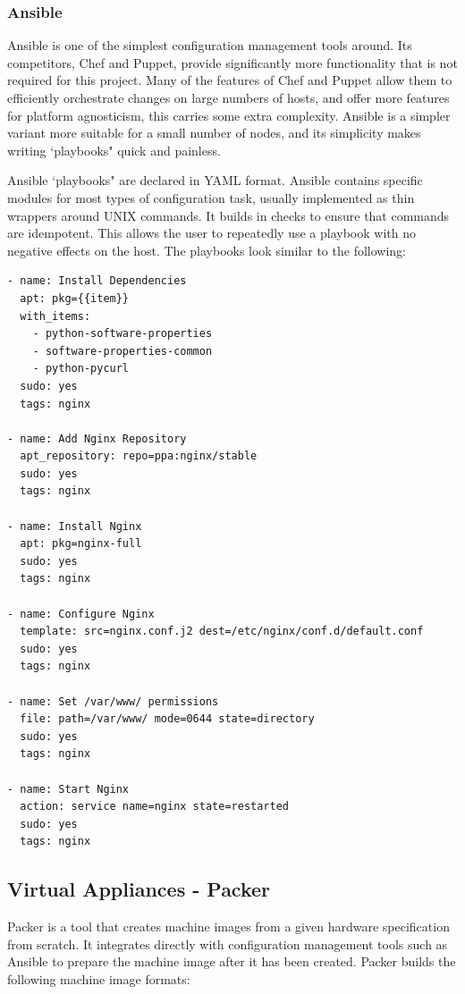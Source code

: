 \documentclass{cshonours}
\begin{document}
\subsubsection{Ansible}

Ansible is one of the simplest configuration management tools around. Its competitors, Chef and Puppet, provide significantly more functionality that is not required for this project. Many of the features of Chef and Puppet allow them to efficiently orchestrate changes on large numbers of hosts, and offer more features for platform agnosticism, this carries some extra complexity. Ansible is a simpler variant more suitable for a small number of nodes, and its simplicity makes writing `playbooks" quick and painless.

Ansible `playbooks" are declared in YAML format. Ansible contains specific modules for most types of configuration task, usually implemented as thin wrappers around UNIX commands. It builds in checks to ensure that commands are idempotent. This allows the user to repeatedly use a playbook with no negative effects on the host. The playbooks look similar to the following:

\begin{listing}[p]
\begin{verbatim}
- name: Install Dependencies
  apt: pkg={{item}}
  with_items:
    - python-software-properties
    - software-properties-common
    - python-pycurl
  sudo: yes
  tags: nginx

- name: Add Nginx Repository
  apt_repository: repo=ppa:nginx/stable
  sudo: yes
  tags: nginx

- name: Install Nginx
  apt: pkg=nginx-full
  sudo: yes
  tags: nginx

- name: Configure Nginx
  template: src=nginx.conf.j2 dest=/etc/nginx/conf.d/default.conf
  sudo: yes
  tags: nginx

- name: Set /var/www/ permissions
  file: path=/var/www/ mode=0644 state=directory
  sudo: yes
  tags: nginx

- name: Start Nginx
  action: service name=nginx state=restarted
  sudo: yes
  tags: nginx
\end{verbatim}
\end{listing}

\subsection{Virtual Appliances - Packer}

Packer is a tool that creates machine images from a given hardware specification from scratch. It integrates directly with configuration management tools such as Ansible to prepare the machine image after it has been created. Packer builds the following machine image formats:
\end{document}
